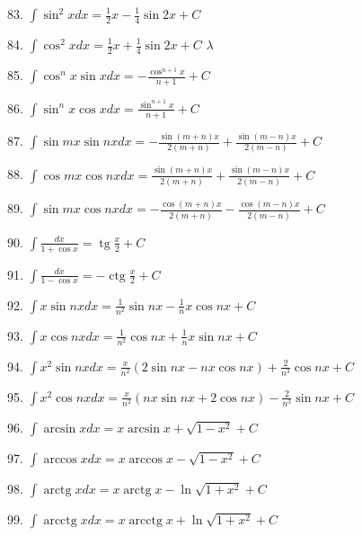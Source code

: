 \documentclass[lang=cn,newtx,10pt,scheme=chinese]{elegantbook}
\begin{document}
83. \(\int {\sin }^{2}{xdx} = \frac{1}{2}x - \frac{1}{4}\sin {2x} + C\)

84. \(\int {\cos }^{2}{xdx} = \frac{1}{2}x + \frac{1}{4}\sin {2x} + C\) \(\lambda\)

85. \(\int {\cos }^{n}x\sin {xdx} = - \frac{{\cos }^{n + 1}x}{n + 1} + C\)

86. \(\int {\sin }^{n}x\cos {xdx} = \frac{{\sin }^{n + 1}x}{n + 1} + C\)

87. \(\int \sin {mx}\sin {nxdx} = - \frac{\sin \left( {m + n}\right) x}{2\left( {m + n}\right) } + \frac{\sin \left( {m - n}\right) x}{2\left( {m - n}\right) } + C\)

88. \(\int \cos {mx}\cos {nxdx} = \frac{\sin \left( {m + n}\right) x}{2\left( {m + n}\right) } + \frac{\sin \left( {m - n}\right) x}{2\left( {m - n}\right) } + C\)

89. \(\int \sin {mx}\cos {nxdx} = - \frac{\cos \left( {m + n}\right) x}{2\left( {m + n}\right) } - \frac{\cos \left( {m - n}\right) x}{2\left( {m - n}\right) } + C\)

90. \(\int \frac{dx}{1 + \cos x} = \operatorname{tg}\frac{x}{2} + C\)

91. \(\int \frac{dx}{1 - \cos x} = - \operatorname{ctg}\frac{x}{2} + C\)

92. \(\int x\sin {nxdx} = \frac{1}{{n}^{2}}\sin {nx} - \frac{1}{n}x\cos {nx} + C\)

93. \(\int x\cos {nxdx} = \frac{1}{{n}^{2}}\cos {nx} + \frac{1}{n}x\sin {nx} + C\)

94. \(\int {x}^{2}\sin {nxdx} = \frac{x}{{n}^{2}}\left( {2\sin {nx} - {nx}\cos {nx}}\right) + \frac{2}{{n}^{3}}\cos {nx} + C\)

95. \(\int {x}^{2}\cos {nxdx} = \frac{x}{{n}^{2}}\left( {{nx}\sin {nx} + 2\cos {nx}}\right) - \frac{2}{{n}^{3}}\sin {nx} + C\)

96. \(\int \arcsin {xdx} = x\arcsin x + \sqrt{1 - {x}^{2}} + C\)

97. \(\int \arccos {xdx} = x\arccos x - \sqrt{1 - {x}^{2}} + C\)

98. \(\int \operatorname{arctg}{xdx} = x\operatorname{arctg}x - \ln \sqrt{1 + {x}^{2}} + C\)

99. \(\int \operatorname{arcctg}{xdx} = x\operatorname{arcctg}x + \ln \sqrt{1 + {x}^{2}} + C\)
\end{document}
